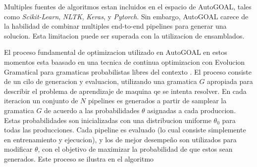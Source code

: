 Multiples fuentes de algoritmos estan incluidos en el espacio de AutoGOAL, tales como \textit{Scikit-Learn}\cite{pedregosa2011scikit}, \textit{NLTK}\cite{nltk}, \textit{Keras}\cite{chollet2015keras}, y \textit{Pytorch}\cite{paszke2019pytorch}. Sin embargo, AutoGOAL carece de la habilidad de combinar multiples end-to-end pipelines para generar una solucion. Esta limitacion puede ser superada con la utilizacion de ensamblados.

El proceso fundamental de optimizacion utilizado en AutoGOAL en estos momentos esta baasado en una tecnica de continua optimizacion con Evolucion Gramatical para gramaticas probabilistas libres del contexto \cite{megane2021probabilistic}. El proceso consiste de un cilo de generacion y evaluacion, utilizando una gramatica $G$ apropiada para describir el problema de aprendizaje de maquina qe se intenta resolver. En cada iteracion un conjunto de $N$ pipelines es generados a partir de samplear la gramatica $G$ de acuerdo a las probabilidades $\theta$ asignadas a cada produccion. Estas probabilidades son inicializadas con una distribucion uniforme $\theta_0$ para todas las producciones. Cada pipeline es evaluado (lo cual consiste simplemente en entrenamiento y ejecucion), y los de mejor desempeño son utilizados para modificar $\theta$, con el objetivo de maximizar la probabilidad de que estos sean generados. Este proceso se ilustra en el algoritmo 

